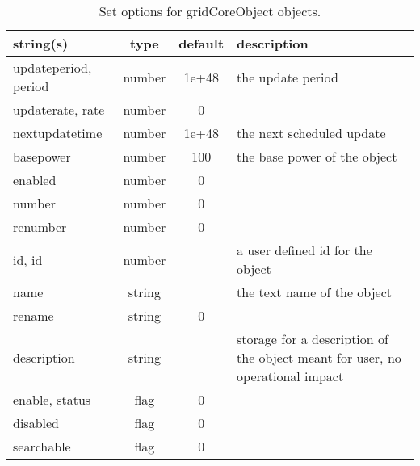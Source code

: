 \begin{table}[ht]
\centering
\begin{tabular}{p{5cm} c c p{7cm}}
\hline
string(s) & type & default & description \\
\hline
updateperiod, period & number & 1e+48 & the update period\\
updaterate, rate & number & 0 & \\
nextupdatetime & number & 1e+48 & the next scheduled update\\
basepower & number & 100 & the base power of the object\\
enabled & number & 0 & \\
number & number & 0 & \\
renumber & number & 0 & \\
id, id & number &  & a user defined id for the object\\
name & string &  & the text name of the object\\
rename & string & 0 & \\
description & string &  & storage for a description of the object meant for user, no operational impact\\
enable, status & flag & 0 & \\
disabled & flag & 0 & \\
searchable & flag & 0 & \\
\hline
\end{tabular}
\caption{Set options for gridCoreObject objects.}
\label{table:gridCoreObject}
\end{table}
